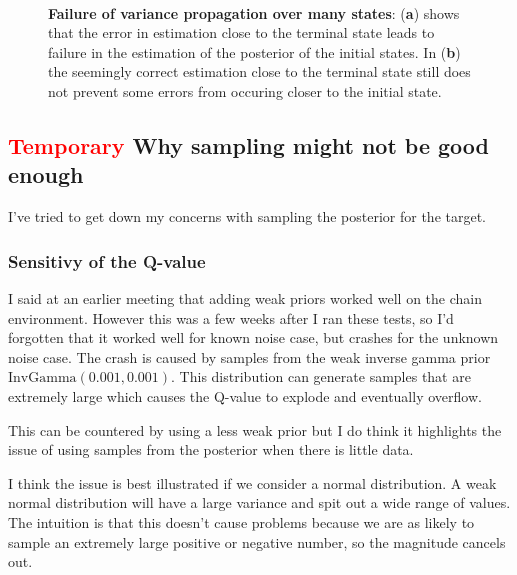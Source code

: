 \begin{figure}[H]
    \centering
    \\

    \caption{\textbf{Failure of variance propagation over many states}: (\textbf{a}) shows that the error in estimation close to the terminal state leads to failure in the estimation of the posterior of the initial states. In (\textbf{b}) the seemingly correct estimation close to the terminal state still does not prevent some errors from occuring closer to the initial state.}
    \label{fig:proptest}
\end{figure}

\subsection{\textcolor{red}{Temporary} Why sampling might not be good enough}

I've tried to get down my concerns with sampling the posterior for the target.
 
\subsubsection{Sensitivy of the Q-value}

I said at an earlier meeting that adding weak priors worked well on the chain environment. However this was a few weeks after I ran these tests, so I'd forgotten that it worked well for known noise case, but crashes for the unknown noise case. The crash is caused by samples from the weak inverse gamma prior $\text{InvGamma}(0.001, 0.001)$. This distribution can generate samples that are extremely large which causes the Q-value to explode and eventually overflow.

This can be countered by using a less weak prior but I do think it highlights the issue of using samples from the posterior when there is little data.

I think the issue is best illustrated if we consider a normal distribution. A weak normal distribution will have a large variance and spit out a wide range of values. The intuition is that this doesn't cause problems because we are as likely to sample an extremely large positive or negative number, so the magnitude cancels out.

